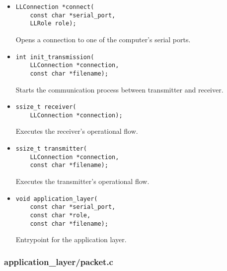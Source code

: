 \documentclass[11pt,a4paper,twocolumn]{article}
\begin{document}
\begin{itemize}
    \item \begin{lstlisting}
LLConnection *connect(
    const char *serial_port,
    LLRole role);
    \end{lstlisting}

          Opens a connection to one of the computer's serial ports.

    \item \begin{lstlisting}
int init_transmission(
    LLConnection *connection, 
    const char *filename);
    \end{lstlisting}

          Starts the communication process between transmitter and receiver.

    \item \begin{lstlisting}
ssize_t receiver(
    LLConnection *connection);
    \end{lstlisting}

          Executes the receiver's operational flow.

    \item \begin{lstlisting}
ssize_t transmitter(
    LLConnection *connection, 
    const char *filename);
    \end{lstlisting}

          Executes the transmitter's operational flow.

    \item \begin{lstlisting}
void application_layer(
    const char *serial_port, 
    const char *role,
    const char *filename);
    \end{lstlisting}

          Entrypoint for the application layer.

\end{itemize}

\subsubsection{application\_layer/packet.c}
\end{document}
